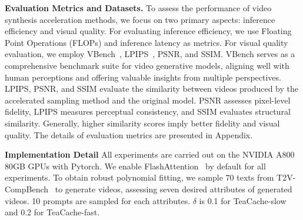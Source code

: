 \textbf{Evaluation Metrics and Datasets.} To assess the performance of video synthesis acceleration methods, we focus on two primary aspects: inference efficiency and visual quality. For evaluating inference efficiency, we use Floating Point Operations (FLOPs) and inference latency as metrics. For visual quality evaluation, we employ VBench~\cite{huang2024vbench}, LPIPS~\cite{zhang2018unreasonable}, PSNR, and SSIM. VBench serves as a comprehensive benchmark suite for video generative models, aligning well with human perceptions and offering valuable insights from multiple perspectives. LPIPS, PSNR, and SSIM evaluate the similarity between videos produced by the accelerated sampling method and the original model. PSNR assesses pixel-level fidelity, LPIPS measures perceptual consistency, and SSIM evaluates structural similarity. Generally, higher similarity scores imply better fidelity and visual quality. The details of evaluation metrics are presented in Appendix.

\textbf{Implementation Detail} All experiments are carried out on the NVIDIA A800 80GB GPUs with Pytorch. We enable FlashAttention~\cite{dao2022flashattention} by default for all experiments.  To obtain robust polynomial fitting, we sample 70 texts from T2V-CompBench~\cite{sun2024t2v} to generate videos, assessing seven desired attributes of generated videos. 10 prompts are sampled for each attributes.
$\delta$ is 0.1 for TeaCache-slow and 0.2 for TeaCache-fast.


